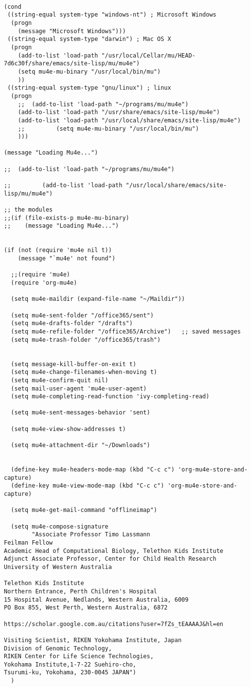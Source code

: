 \documentclass[12pt]{article}
\begin{document}
\begin{verbatim}

(cond
 ((string-equal system-type "windows-nt") ; Microsoft Windows
  (progn
    (message "Microsoft Windows")))
 ((string-equal system-type "darwin") ; Mac OS X
  (progn
    (add-to-list 'load-path "/usr/local/Cellar/mu/HEAD-7d6c30f/share/emacs/site-lisp/mu/mu4e")
    (setq mu4e-mu-binary "/usr/local/bin/mu")
    ))
 ((string-equal system-type "gnu/linux") ; linux
  (progn
    ;;  (add-to-list 'load-path "~/programs/mu/mu4e")
    (add-to-list 'load-path "/usr/share/emacs/site-lisp/mu4e")
    (add-to-list 'load-path "/usr/local/share/emacs/site-lisp/mu4e")
    ;;         (setq mu4e-mu-binary "/usr/local/bin/mu")
    )))

(message "Loading Mu4e...")

;;  (add-to-list 'load-path "~/programs/mu/mu4e")

;;         (add-to-list 'load-path "/usr/local/share/emacs/site-lisp/mu/mu4e")

;; the modules
;;(if (file-exists-p mu4e-mu-binary)
;;    (message "Loading Mu4e...")


(if (not (require 'mu4e nil t))
    (message "`mu4e' not found")

  ;;(require 'mu4e)
  (require 'org-mu4e)

  (setq mu4e-maildir (expand-file-name "~/Maildir"))

  (setq mu4e-sent-folder "/office365/sent")
  (setq mu4e-drafts-folder "/drafts")
  (setq mu4e-refile-folder "/office365/Archive")   ;; saved messages
  (setq mu4e-trash-folder "/office365/trash")


  (setq message-kill-buffer-on-exit t)
  (setq mu4e-change-filenames-when-moving t)
  (setq mu4e-confirm-quit nil)
  (setq mail-user-agent 'mu4e-user-agent)
  (setq mu4e-completing-read-function 'ivy-completing-read)

  (setq mu4e-sent-messages-behavior 'sent)

  (setq mu4e-view-show-addresses t)

  (setq mu4e-attachment-dir "~/Downloads")


  (define-key mu4e-headers-mode-map (kbd "C-c c") 'org-mu4e-store-and-capture)
  (define-key mu4e-view-mode-map (kbd "C-c c") 'org-mu4e-store-and-capture)

  (setq mu4e-get-mail-command "offlineimap")

  (setq mu4e-compose-signature
        "Associate Professor Timo Lassmann
Feilman Fellow
Academic Head of Computational Biology, Telethon Kids Institute
Adjunct Associate Professor, Center for Child Health Research
University of Western Australia

Telethon Kids Institute
Northern Entrance, Perth Children's Hospital
15 Hospital Avenue, Nedlands, Western Australia, 6009
PO Box 855, West Perth, Western Australia, 6872

https://scholar.google.com.au/citations?user=7fZs_tEAAAAJ&hl=en

Visiting Scientist, RIKEN Yokohama Institute, Japan
Division of Genomic Technology,
RIKEN Center for Life Science Technologies,
Yokohama Institute,1-7-22 Suehiro-cho,
Tsurumi-ku, Yokohama, 230-0045 JAPAN")
  )
\end{verbatim}
\end{document}

